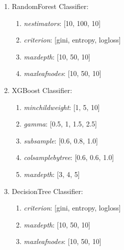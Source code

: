 \documentclass[12pt,a4paper,openright,twoside]{book}
\begin{document}
\begin{enumerate}
    
    \item RandomForest Classifier:
    
    \begin{enumerate}
       
        \item \emph{n\textunderscore estimators}: [10, 100, 10]
       
        \item \emph{criterion}: [gini, entropy, log\textunderscore loss]
       
        \item \emph{max\textunderscore depth}: [10, 50, 10]
       
        \item \emph{max\textunderscore leaf\textunderscore nodes}: [10, 50, 10]
    
    \end{enumerate}
    
    \item XGBoost Classifier:
    
    \begin{enumerate}
    
        \item \emph{min\textunderscore child\textunderscore weight}: [1, 5, 10]
    
        \item \emph{gamma}: [0.5, 1, 1.5, 2.5]
    
        \item \emph{subsample}: [0.6, 0.8, 1.0]
    
        \item \emph{colsample\textunderscore bytree}: [0.6, 0.6, 1.0]
    
        \item \emph{max\textunderscore depth}: [3, 4, 5]
    
    \end{enumerate}
    
    \item DecisionTree Classifier:
    
    \begin{enumerate}
    
        \item \emph{criterion}: [gini, entropy, log\textunderscore loss]
    
        \item \emph{max\textunderscore depth}: [10, 50, 10]
    
        \item \emph{max\textunderscore leaf\textunderscore nodes}: [10, 50, 10]
    
    
    \end{enumerate}

\end{enumerate}
\end{document}
